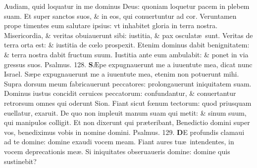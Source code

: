 \documentclass[a5paper,10pt]{book}
\def\ae{æ}
\def\AE{Æ}
\def\oe{œ}
\begin{document}
\begin{multicols*}{2}
\newline \color{red} A\color{black}udiam, quid loquatur in me dominus Deus: quoniam loquetur pacem in plebem suam.
\newline \color{red} E\color{black}t super sanctos suos, \& in eos, qui conuertuntur ad cor.
\newline \color{red} V\color{black}eruntamen prope timentes eum salutare ipsius: vt inhabitet gloria in terra nostra.
\newline \color{red} M\color{black}isericordia, \& veritas obuiauerunt sibi: iustitia, \& pax osculat\ae \ sunt.
\newline \color{red} V\color{black}eritas de terra orta est: \& iustitia de c\oe lo prospexit.
\newline \color{red} E\color{black}tenim dominus dabit benignitatem: \& terra nostra dabit fructum suum.
\newline \color{red} I\color{black}ustitia ante eum ambulabit: \& ponet in via gressus suos. \quad \color{red} Psalmus. \hypertarget{ps128}{128.} \color{black}
\vspace{-.25em}
\lettrine[lines=2]{\bfseries \color{red} S}{}\AE pe expugnauerunt me a iuuentute mea, dicat nunc Israel.
\newline \color{red} S\color{black}\ae pe expugnauerunt me a iuuentute mea, etenim non potuerunt mihi.
\newline \color{red} S\color{black}upra dorsum meum fabricauerunt peccatores: prolongauerunt iniquitatem suam.
\newline \color{red} D\color{black}ominus iustus concidit ceruices peccatorum: confundantur, \& conuertantur retrorsum omnes qui oderunt Sion.
\newline \color{red} F\color{black}iant sicut f\oe num tectorum: quod priusquam euellatur, exaruit.
\newline \color{red} D\color{black}e quo non impleuit manum suam qui metit: \& sinum suum, qui manipulos colligit.
\newline \color{red} E\color{black}t non dixerunt qui pr\ae teribant, Benedictio domini super vos, benediximus vobis in nomine domini. \color{red} Psalmus. \hypertarget{ps129}{129.} \color{black}
\vspace{-1.5em}
\lettrine[lines=2]{\bfseries \color{red} D}{}E profundis clamaui ad te domine: domine exaudi vocem meam.
\newline \color{red} F\color{black}iant aures tu\ae \ intendentes, in vocem deprecationis me\ae .
\newline \color{red} S\color{black}i iniquitates obseruaueris domine: domine quis sustinebit?

\end{multicols*}
\end{document}
